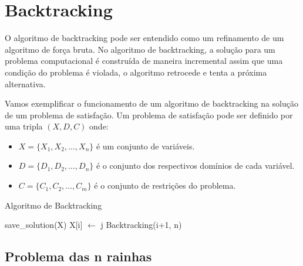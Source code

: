 



















\section{Backtracking}

O algoritmo de backtracking pode ser entendido como um refinamento de um algoritmo de força bruta. No algoritmo de backtracking, a solução para um problema computacional é construída de maneira incremental assim que uma condição do problema é violada, o algoritmo retrocede e tenta a próxima alternativa.

Vamos exemplificar o funcionamento de um algoritmo de backtracking na solução de um problema de satisfação. Um problema de satisfação pode ser definido por uma tripla $(X, D, C)$ onde:

\begin{itemize}
    \item $X = \{X_1, X_2, \ldots, X_n\}$ é um conjunto de variáveis.
    \item $D = \{D_1, D_2, \ldots, D_n\}$ é o conjunto dos respectivos domínios de cada variável.
    \item $C = \{C_1,C_2, \ldots,C_m\}$ é o conjunto de restrições do problema.
\end{itemize}


\begin{algorithm}
  \caption{Algoritmo de Backtracking}\label{AIPal}
  \begin{algorithmic}
    
        \State save\_solution(X)
    \Else 
            \State X[i] $\leftarrow$ j
            \State Backtracking(i+1, n)
            \EndIf
        \EndFor
    \EndIf
     
    \EndFunction
  \end{algorithmic}
\end{algorithm}

\subsection{Problema das n rainhas}

